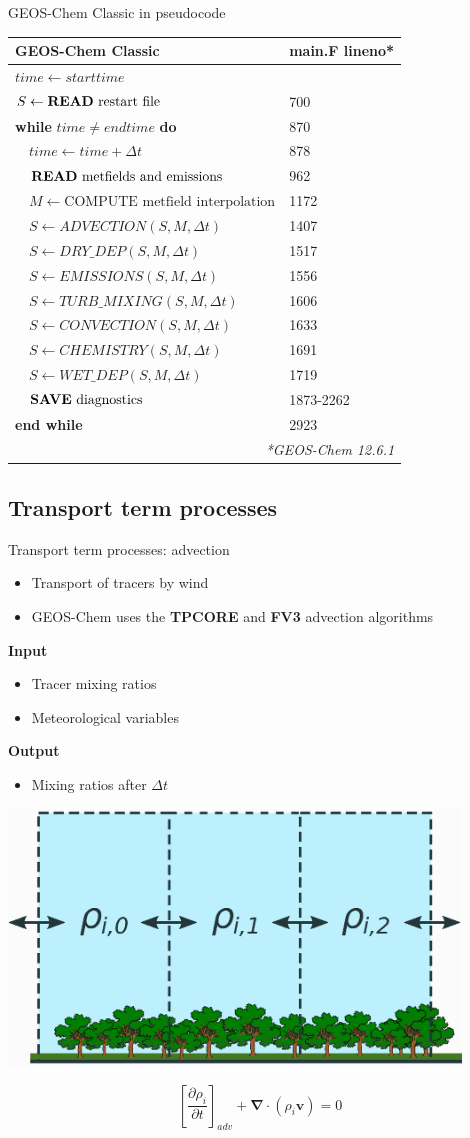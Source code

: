 \documentclass[10pt]{beamer}
\newcommand{\gccpseudocode}{%
    \small
    \setlength{\tabcolsep}{20pt}
    \begin{table}[]
    \begin{tabular}{ll}
    \hline
    \textbf{GEOS-Chem Classic} & \textbf{main.F lineno}* \\ \hline
    $time \leftarrow starttime$ &  \\
    $S \leftarrow \text{\textbf{READ} restart file}$ &  700 \\
    \textbf{while} $time \neq endtime$ \textbf{do} & 870 \\
    $\quad time \leftarrow time + \Delta t$ & 878 \\
    $\quad \text{\textbf{READ} metfields and emissions}$ & 962 \\
    $\quad M \leftarrow \text{COMPUTE metfield interpolation}$ & 1172 \\
    $\quad S \leftarrow ADVECTION(S, M, \Delta t)$ & 1407 \\
    $\quad S \leftarrow DRY\_DEP(S, M, \Delta t)$ & 1517 \\
    $\quad S \leftarrow EMISSIONS(S, M, \Delta t)$ & 1556 \\
    $\quad S \leftarrow TURB\_MIXING(S, M, \Delta t)$ & 1606 \\
    $\quad S \leftarrow CONVECTION(S, M, \Delta t)$ & 1633 \\
    $\quad S \leftarrow CHEMISTRY(S, M, \Delta t)$& 1691 \\
    $\quad S \leftarrow WET\_DEP(S, M, \Delta t)$ & 1719 \\
    $\quad \text{\textbf{SAVE} diagnostics}$ & 1873-2262 \\
    \textbf{end while} & 2923 \\ \hline
    \multicolumn{2}{r}{\fontsize{4}{4}\selectfont\textit{*GEOS-Chem 12.6.1}} \\
    \end{tabular}
    \end{table}
}
\begin{document}
\begin{frame}[fragile]{GEOS-Chem Classic in pseudocode}
    \gccpseudocode
\end{frame}

\subsection{Transport term processes}
\frame{\sectionpage}

\begin{frame}[fragile]{Transport term processes: advection}
    \begin{minipage}[c]{0.5\textwidth}
        \begin{itemize}
            \item Transport of tracers by wind
            \vspace{0.3cm}
            \item GEOS-Chem uses the \textbf{TPCORE} and \textbf{FV3} advection algorithms
        \end{itemize}
            \vspace{0.5cm}
            \textbf{Input} 
            \begin{itemize}
                \item Tracer mixing ratios
                \item Meteorological variables
            \end{itemize}
            \textbf{Output}
            \begin{itemize}
                \item Mixing ratios after $\Delta t$
            \end{itemize}
    \end{minipage} \hfill
    \begin{minipage}[c]{0.49\textwidth}
    \begin{center}
        \includegraphics[width=0.9\textwidth]{box-model-advection.eps}    
    \end{center}
    \vspace{0.5cm}
    $$
        \left[ \frac{\partial \rho_i}{\partial t} \right]_{adv} + \boldsymbol \nabla \cdot (\rho_i \boldsymbol v) = 0
    $$
    \end{minipage}
\end{frame}
\end{document}
